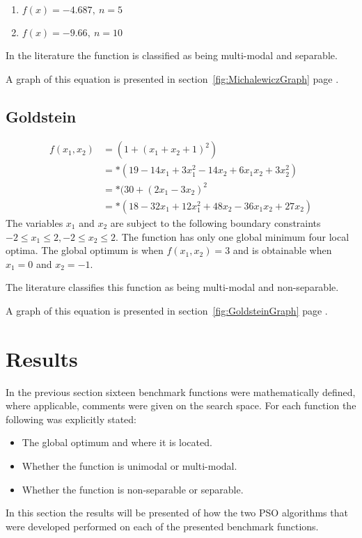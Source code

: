 \begin{enumerate}
\item $f(x) = -4.687,\: n = 5$
\item $f(x) = -9.66,\: n = 10$
\end{enumerate}
In the literature the function is classified as being multi-modal and separable\cite{ABCCompareStudy}.

A graph of this equation is presented in section~\ref{fig:MichalewiczGraph} page \pageref{fig:MichalewiczGraph}.
\subsection{Goldstein}
\begin{align}
	f(x_1,x_2) &= (1 + (x_1 + x_2 + 1)^2)\nonumber\\
			   &=*(19-14x_1+3x_1^2 -14x_2 + 6x_1x_2 + 3x_2^2)\nonumber\\
			   &=*(30 + (2x_1 -3x_2)^2\nonumber\\
			   &=*(18 - 32x_1 + 12x_1^2 +48x_2 -36x_1x_2 + 27x_2)\nonumber
\end{align}
The variables $x_1$ and $x_2$ are subject to the following boundary constraints $-2 \leq x_1 \leq 2, -2 \leq x_2 \leq 2$\cite{ABCCompareStudy,TSGlobalOptimization,TSGlobalOptContinFunc,ContinACSTS,TestFunctions}. The function has only one global minimum four local optima\cite{ABCCompareStudy,TSGlobalOptimization}. The global optimum is when $f(x_1,x_2) = 3$ and is obtainable when $x_1 = 0$ and $x_2 = -1$\cite{ABCCompareStudy,TSGlobalOptimization,TSGlobalOptContinFunc,ContinACSTS,TestFunctions}.

The literature classifies this function as being multi-modal and non-separable\cite{ABCCompareStudy}.

A graph of this equation is presented in section~\ref{fig:GoldsteinGraph} page \pageref{fig:GoldsteinGraph}.

\section{Results}
\label{sec:benchResults}
In the previous section sixteen benchmark functions were mathematically defined, where applicable, comments were given on the search space. For each function the following was explicitly stated:
\begin{itemize}
\item The global optimum and where it is located.
\item Whether the function is unimodal or multi-modal.
\item Whether the function is non-separable or separable.
\end{itemize}
In this section the results will be presented of how the two PSO algorithms that were developed performed on each of the presented benchmark functions. 

